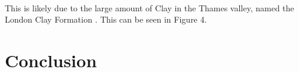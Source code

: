 \documentclass[11pt]{article}
\begin{document}
\vspace{1cm}
\\
This is likely due to the large amount of Clay in the Thames valley, named the London Clay Formation \cite{sumbler1996london}. This can be seen in Figure 4.













\section{Conclusion}

\newpage
\printbibliography
\end{document}

